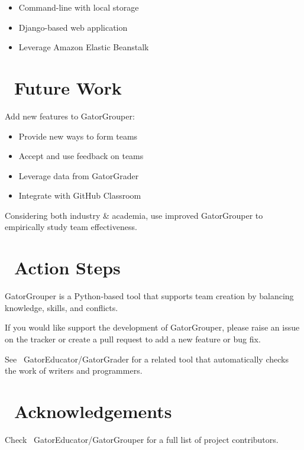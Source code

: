 \documentclass[a0paper,fleqn]{betterposter}
\begin{document}
{\begin{itemize}[leftmargin=*]
    \item{Command-line with local storage}
    \item{Django-based web application}
    \item{Leverage Amazon Elastic Beanstalk}

  \end{itemize}

  \section{\faDashboard~Future Work}
  Add new features to GatorGrouper: \\
  \vspace*{-.5in}

  \begin{itemize}[leftmargin=*]

    \item{Provide new ways to form teams}
    \item{Accept and use feedback on teams}
    \item{Leverage data from GatorGrader}
    \item{Integrate with GitHub Classroom}

  \end{itemize}

  \vspace{.5em}
  Considering both industry \& academia, use improved GatorGrouper to
  empirically study team effectiveness.

  \section{\faRocket~Action Steps}
  GatorGrouper is a Python-based tool that supports team creation by balancing
  knowledge, skills, and conflicts.

  \vspace*{.25in}
  If you would like support the development of GatorGrouper, please raise an
  issue on the tracker or create a pull request to add a new feature or bug fix.

  \vspace*{.25in}
  See \faGithubAlt~GatorEducator/GatorGrader for a related tool that
  automatically checks the work of writers and programmers.

  \section{\faThumbsOUp~Acknowledgements}
  Check \faGithubAlt~GatorEducator/GatorGrouper for a full list of project
  contributors.


}
\end{document}
